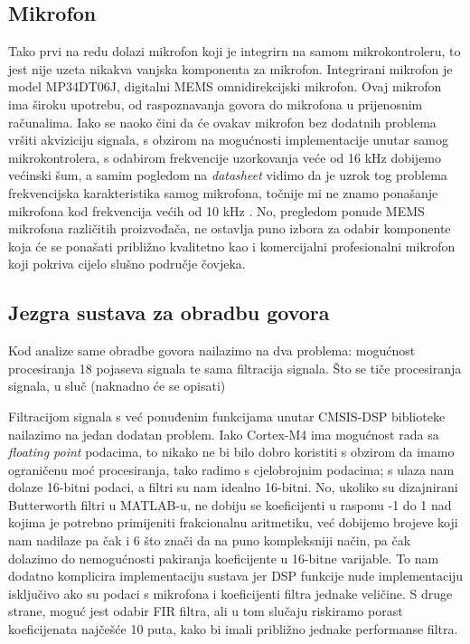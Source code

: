 \documentclass[times, utf8, diplomski]{fer}
\begin{document}
\subsection{Mikrofon}
Tako prvi na redu dolazi mikrofon koji je integrirn na samom mikrokontroleru, to jest nije uzeta nikakva vanjska komponenta za mikrofon. Integrirani mikrofon je model MP34DT06J, digitalni MEMS omnidirekcijski mikrofon. Ovaj mikrofon ima široku upotrebu, od raspoznavanja govora do mikrofona u prijenosnim računalima. Iako se naoko čini da će ovakav mikrofon bez dodatnih problema vršiti akviziciju signala, s obzirom na mogućnosti implementacije unutar samog mikrokontrolera, s odabirom frekvencije uzorkovanja veće od 16 kHz dobijemo većinski šum, a samim pogledom na \textit{datasheet} vidimo da je uzrok tog problema frekvencijska karakteristika samog mikrofona, točnije mi ne znamo ponašanje mikrofona kod frekvencija većih od 10 kHz \citep{mic}. No, pregledom ponude MEMS mikrofona različitih proizvođača, ne ostavlja puno izbora za odabir komponente koja će se ponašati približno kvalitetno kao i komercijalni profesionalni mikrofon koji pokriva cijelo slušno područje čovjeka.

\subsection{Jezgra sustava za obradbu govora}
Kod analize same obradbe govora nailazimo na dva problema: mogućnost procesiranja 18 pojaseva signala te sama filtracija signala. Što se tiče procesiranja signala, u sluč (naknadno će se opisati)

Filtracijom signala s već ponuđenim funkcijama unutar CMSIS-DSP biblioteke nailazimo na jedan dodatan problem. Iako Cortex-M4 ima mogućnost rada sa \textit{floating point} podacima, to nikako ne bi bilo dobro koristiti s obzirom da imamo ograničenu moć procesiranja, tako radimo s cjelobrojnim podacima; s ulaza nam dolaze 16-bitni podaci, a filtri su nam idealno 16-bitni. No, ukoliko su dizajnirani Butterworth filtri u MATLAB-u, ne dobiju se koeficijenti u rasponu -1 do 1 nad kojima je potrebno primijeniti frakcionalnu aritmetiku, već dobijemo brojeve koji nam nadilaze pa čak i 6 što znači da na puno kompleksniji način, pa čak dolazimo do nemogućnosti pakiranja koeficijente u 16-bitne varijable. To nam dodatno komplicira implementaciju sustava jer DSP funkcije nude implementaciju isključivo ako su podaci s mikrofona i koeficijenti filtra jednake veličine. S druge strane, moguć jest odabir FIR filtra, ali u tom slučaju riskiramo porast koeficijenata najčešće 10 puta, kako bi imali približno jednake performanse filtra.
\end{document}
